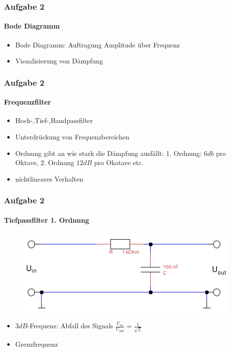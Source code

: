 \begin{frame}
\frametitle{Aufgabe 2}
\framesubtitle{Bode Diagramm}
    \begin{itemize}
        \item Bode Diagramm: Auftragung Amplitude über Frequenz
        \item Visualisierung von Dämpfung
    \end{itemize}
\end{frame}
\begin{frame}
\frametitle{Aufgabe 2}
\framesubtitle{Frequenzfilter}
    \begin{itemize}
        \item Hoch-,Tief-,Bandpassfilter
        \item Unterdrückung von Frequenzbereichen
        \item Ordnung gibt an wie stark die Dämpfung ausfällt: 1. Ordnung:
        $6db$ pro Oktave, 2. Ordnung $12dB$ pro Okatave etc.
        \item nichtlineares Verhalten
    \end{itemize}
\end{frame}
\begin{frame}
\frametitle{Aufgabe 2}
\framesubtitle{Tiefpassfilter 1. Ordnung}
\begin{figure}[H]
\begin{center}
        \includegraphics[scale=0.2]{./img/2a_bode_schaltbild.png}
\end{center}
\end{figure}
\begin{itemize}
    \item $3dB$-Frequenz: Abfall des Signals
    $\frac{U_{in}}{U_{out}}=\frac{1}{\sqrt{2}}$
    \item Grenzfrequenz
\end{itemize}
\end{frame}
